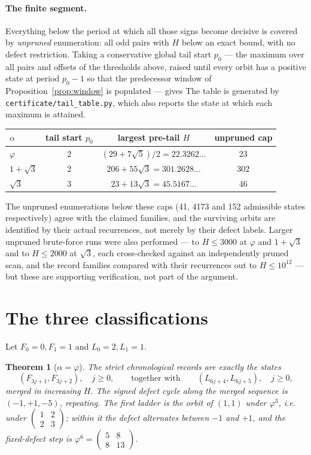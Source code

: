 \documentclass[11pt]{article}
\newtheorem{theorem}{Theorem}[section]
\theoremstyle{definition}
\theoremstyle{remark}
\newcommand{\mat}[4]{\left(\begin{smallmatrix}#1&#2\\#3&#4\end{smallmatrix}\right)}
\begin{document}
\paragraph{The finite segment.}
Everything below the period at which all those signs become decisive is covered by
\emph{unpruned} enumeration: all odd pairs with $H$ below an exact bound, with no defect
restriction. Taking a conservative global tail start $p_0$ --- the maximum over all pairs and
offsets of the thresholds above, raised until every orbit has a positive state at period
$p_0-1$ so that the predecessor window of Proposition~\ref{prop:window} is populated --- gives
The table is generated by \texttt{certificate/tail\_table.py}, which also reports the state at
which each maximum is attained.
\begin{center}
\begin{tabular}{lccc}
\toprule
$\alpha$ & tail start $p_0$ & largest pre-tail $H$ & unpruned cap \\
\midrule
$\varphi$ & $2$ & $(29+7\sqrt5)/2=22.3262\ldots$ & $23$ \\
$1+\sqrt3$ & $2$ & $206+55\sqrt3=301.2628\ldots$ & $302$ \\
$\sqrt3$ & $3$ & $23+13\sqrt3=45.5167\ldots$ & $46$ \\
\bottomrule
\end{tabular}
\end{center}
The unpruned enumerations below these caps (41, 4173 and 152 admissible states respectively)
agree with the claimed families, and the surviving orbits are identified by their actual
recurrences, not merely by their defect labels. Larger unpruned brute-force runs were also performed --- to
$H\le3000$ at $\varphi$ and $1+\sqrt3$ and to $H\le2000$ at $\sqrt3$, each cross-checked against
an independently pruned scan, and the record families compared with their recurrences out to
$H\le10^{12}$ --- but these are supporting verification, not part of the argument.

\section{The three classifications}\label{sec:classify}

Let $F_0=0,F_1=1$ and $L_0=2,L_1=1$.

\begin{theorem}[$\alpha=\varphi$]\label{thm:A}
The strict chronological records are exactly the states
\[
(F_{3j+1},F_{3j+2}),\quad j\ge0,\qquad\text{together with}\qquad (L_{6j+4},L_{6j+5}),\quad j\ge0,
\]
merged in increasing $H$. The signed defect cycle along the merged sequence is
$(-1,+1,-5)$, repeating. The first ladder is the orbit of $(1,1)$ under $\varphi^3$,
i.e. under $\mat{1}{2}{2}{3}$; within it the defect alternates between $-1$ and $+1$, and the
fixed-defect step is $\varphi^6=\mat{5}{8}{8}{13}$.
\end{theorem}
\end{document}
